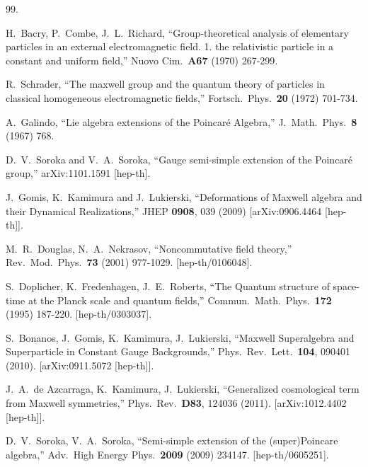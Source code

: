 \documentclass[prd,reprint,eqsecnum,nofootinbib]{revtex4-1}
\begin{document}
\begin{thebibliography}{99.}

  H.~Bacry, P.~Combe, J.~L.~Richard,
  ``Group-theoretical analysis of elementary particles in an external electromagnetic field. 1.
  the relativistic particle in a constant and uniform field,''
  Nuovo Cim.\  {\bf A67 } (1970)  267-299.

  R.~Schrader,
  ``The maxwell group and the quantum theory of particles in classical homogeneous electromagnetic fields,''
  Fortsch.\ Phys.\  {\bf 20 } (1972)  701-734.

  A.~Galindo,
  ``Lie algebra extensions of the Poincar\'e Algebra,''
  J.\ Math.\ Phys.\  {\bf 8 } (1967)  768.

  D.~V.~Soroka and V.~A.~Soroka,
  ``Gauge semi-simple extension of the Poincar\'e group,''
  arXiv:1101.1591 [hep-th].

  J.~Gomis, K.~Kamimura and J.~Lukierski,
  ``Deformations of Maxwell algebra and their Dynamical Realizations,''
  JHEP {\bf 0908}, 039 (2009)
  [arXiv:0906.4464 [hep-th]].

  M.~R.~Douglas, N.~A.~Nekrasov,
  ``Noncommutative field theory,''
  Rev.\ Mod.\ Phys.\  {\bf 73 } (2001)  977-1029.
  [hep-th/0106048].

  S.~Doplicher, K.~Fredenhagen, J.~E.~Roberts,
  ``The Quantum structure of space-time at the Planck scale and quantum fields,''
  Commun.\ Math.\ Phys.\  {\bf 172 } (1995)  187-220.
  [hep-th/0303037].

  S.~Bonanos, J.~Gomis, K.~Kamimura, J.~Lukierski,
 ``Maxwell Superalgebra and Superparticle in Constant Gauge Backgrounds,''
  Phys.\ Rev.\ Lett.\  {\bf 104}, 090401 (2010).
  [arXiv:0911.5072 [hep-th]].

  J.~A.~de Azcarraga, K.~Kamimura, J.~Lukierski,
  ``Generalized cosmological term from Maxwell symmetries,''
  Phys.\ Rev.\  {\bf D83}, 124036 (2011).
  [arXiv:1012.4402 [hep-th]].

  D.~V.~Soroka, V.~A.~Soroka,
  ``Semi-simple extension of the (super)Poincare algebra,''
  Adv.\ High Energy Phys.\  {\bf 2009 } (2009)  234147.
  [hep-th/0605251].


\end{thebibliography}
\end{document}
